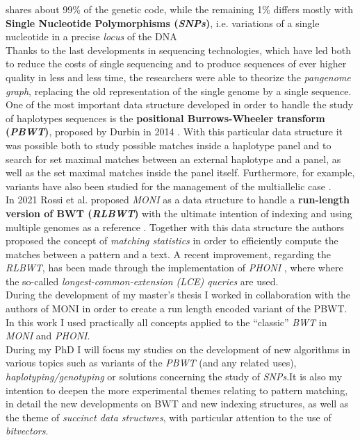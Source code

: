 \documentclass[a4paper,11pt, oneside]{article}
\begin{document}
shares about 99\% of the genetic code, while the remaining 1\% differs mostly
with \textbf{Single Nucleotide Polymorphisms (\textit{SNPs})}, i.e. variations
of a single nucleotide in a precise \textit{locus} of the DNA\\ 
Thanks to the last developments in sequencing technologies, which have led both
to reduce the costs of single sequencing and to produce sequences of ever higher
quality in less and less time, the researchers were able to theorize the
\textit{pangenome graph}, replacing the old representation of the single genome
by a single sequence. \\
One of the most important data structure developed in order to handle the study
of haplotypes sequences is the \textbf{positional Burrows-Wheeler transform
  (\textit{PBWT})}, proposed by Durbin in 2014 \cite{pbwt_durbin}. With this
particular data structure it was possible both to study possible matches inside
a haplotype panel and to search for set maximal matches between an external
haplotype and a panel, as well as the set maximal matches inside the panel
itself. Furthermore, for example, variants have also been studied for the 
management of the multiallelic case \cite{mpbwt}. \\
In 2021 Rossi et al. proposed \textit{MONI} as a data structure to handle a
\textbf{run-length version of BWT (\textit{RLBWT})} with the ultimate intention
of indexing and using multiple genomes as a reference \cite{moni}. Together with
this data structure the authors proposed the concept of \textit{matching
  statistics} in order to efficiently compute the matches between a pattern and
a text. A recent improvement, regarding the \textit{RLBWT}, has been made
through the implementation of \textit{PHONI} \cite{phoni}, where where the
so-called \textit{longest-common-extension (LCE) queries} are used. \\
During the development of my master's thesis I worked in collaboration with the
authors of MONI in order to create a run length encoded variant of the PBWT. In
this work I used practically all concepts applied to the ``classic''
\textit{BWT} in \textit{MONI} and \textit{PHONI}. \\
During my PhD I will focus my studies on the development of new algorithms in
various topics such as variants of the \textit{PBWT} (and any related uses),
\textit{haplotyping/genotyping} or solutions concerning the study of
\textit{SNPs}.It is also my intention to deepen the more experimental themes
relating to pattern matching, in detail the new developments on BWT and new
indexing structures, as well as the theme of \textit{succinct data structures},
with particular attention to the use of \textit{bitvectors}. 
\end{document}
